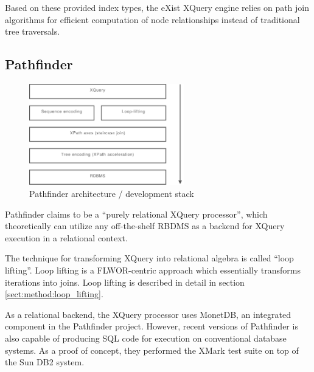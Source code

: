 Based on these provided index types, the eXist XQuery engine relies on path
join algorithms\cite{exist_idx_drv_query} for efficient computation of node
relationships instead of traditional tree traversals. 

\subsection{Pathfinder}
\begin{figure}[h]
  \centering
    \includegraphics[width=0.6\textwidth]{diagrams/pathfinder_arch}
  \caption{Pathfinder architecture / development stack}
\end{figure}
Pathfinder\cite{pathfinderHome} claims to be a ``purely relational XQuery
processor'', which theoretically can utilize any off-the-shelf RBDMS as a
backend for XQuery execution in a relational context.

The technique for transforming XQuery into relational algebra is called ``loop
lifting''\cite{pathfinder_mothertongue}. Loop lifting is a FLWOR-centric
approach which essentially transforms iterations into joins. Loop lifting is
described in detail in section \ref{sect:method:loop_lifting}.

As a relational backend, the XQuery processor uses MonetDB, an integrated
component in the Pathfinder project. However, recent versions of Pathfinder is
also capable of producing SQL code for execution on conventional database
systems. As a proof of concept, they performed the XMark test suite on top of
the Sun DB2 system\cite{pathfinder_sql}.

